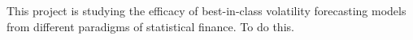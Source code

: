 This project is studying the efficacy of best-in-class volatility forecasting models from different paradigms of statistical finance. To do this.
